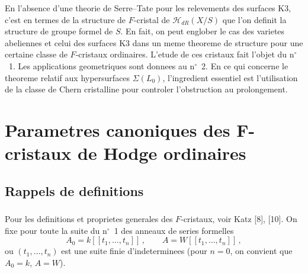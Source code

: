\documentclass[12pt,a4paper]{article}
\theoremstyle{plain}
\theoremstyle{definition}
\theoremstyle{remark}
\begin{document}
En l'absence d'une theorie de Serre--Tate pour les relevements des surfaces K3, c'est en termes de la structure de $F$-cristal de $\mathcal{H}_{dR}(X/S)$ que l'on definit la structure de groupe formel de $S$. En fait, on peut englober le cas des varietes abeliennes et celui des surfaces K3 dans un meme theoreme de structure pour une certaine classe de $F$-cristaux ordinaires. L'etude de ces cristaux fait l'objet du n$^\circ$\ 1. Les applications geometriques sont donnees au n$^\circ$\ 2. En ce qui concerne le theoreme relatif aux hypersurfaces $\Sigma(L_0)$, l'ingredient essentiel est l'utilisation de la classe de Chern cristalline pour controler l'obstruction au prolongement.

\section{Parametres canoniques des F-cristaux de Hodge ordinaires}

\subsection{Rappels de definitions}

\subsubsection{}

Pour les definitions et proprietes generales des $F$-cristaux, voir Katz [8], [10]. On fixe pour toute la suite du n$^\circ$\ 1 des anneaux de series formelles
\[
A_0 = k[[t_1, \ldots, t_n]]\,, \qquad A = W[[t_1, \ldots, t_n]]\,,
\]
ou $(t_1, \ldots, t_n)$ est une suite finie d'indeterminees (pour $n = 0$, on convient que $A_0 = k$, $A = W$).
\end{document}
